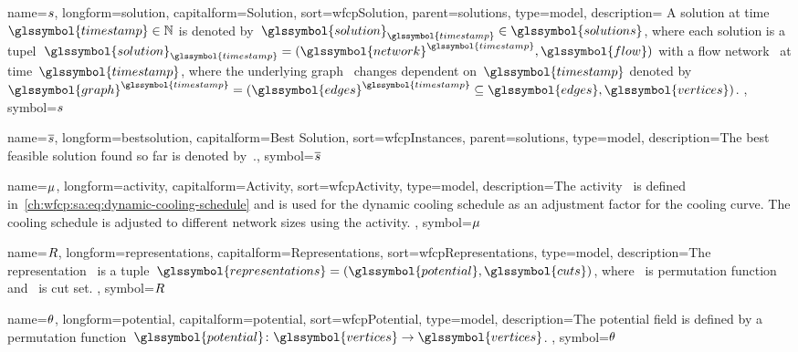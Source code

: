 {
    name={\ensuremath{\solution}},
    longform={solution},
    capitalform={Solution},
    sort={wfcpSolution},
    parent={solutions},
    type={model},
    description={ A solution at time~\mbox{$\glssymbol{timestamp}\in\naturals$}
    is denoted
    by~$\glssymbol{solution}_{\glssymbol{timestamp}}\in\glssymbol{solutions}$,
    where each solution is a
    tupel~$\glssymbol{solution}_{\glssymbol{timestamp}}=(\glssymbol{network}^{\glssymbol{timestamp}},
    \glssymbol{flow})$
    with a flow network~ at time~$\glssymbol{timestamp}$, where
    the underlying graph~ changes dependent on~$\glssymbol{timestamp}$ denoted
    by~$\glssymbol{graph}^{\glssymbol{timestamp}}=(
    \glssymbol{edges}^{\glssymbol{timestamp}}\subseteq\glssymbol{edges},\glssymbol{vertices})$.
    },
    symbol={\ensuremath{\solution}}
}

{
    name={\ensuremath{\bestsolution}},
    longform={bestsolution},
    capitalform={Best Solution},
    sort={wfcpInstances},
    parent={solutions},
    type={model},
    description={The best feasible solution found so far is denoted
    by~.},
    symbol={\ensuremath{\bestsolution}}
}

{
    name={\ensuremath{\activity}},
    longform={activity},
    capitalform={Activity},
    sort={wfcpActivity},
    type={model},
    description={The activity~ is defined
    in~\cref{ch:wfcp:sa:eq:dynamic-cooling-schedule} and is used for the dynamic
    cooling schedule as an adjustment factor for the cooling curve. The cooling
    schedule is adjusted to different network sizes using the activity. },
    symbol={\ensuremath{\activity}}
}

{
    name={\ensuremath{\representations}},
    longform={representations},
    capitalform={Representations},
    sort={wfcpRepresentations},
    type={model},
    description={The representation~ is a
    tuple~$\glssymbol{representations}=(\glssymbol{potential},
    \glssymbol{cuts})$, where~ is permutation function
    and~ is cut set.
    },
    symbol={\ensuremath{\representations}}
}

{
    name={\ensuremath{\potential}},
    longform={potential},
    capitalform={potential},
    sort={wfcpPotential},
    type={model},
    description={The potential field is defined by a permutation
    function~$\glssymbol{potential}\colon\glssymbol{vertices}\to\glssymbol{vertices}$.
    },
    symbol={\ensuremath{\potential}}
}

